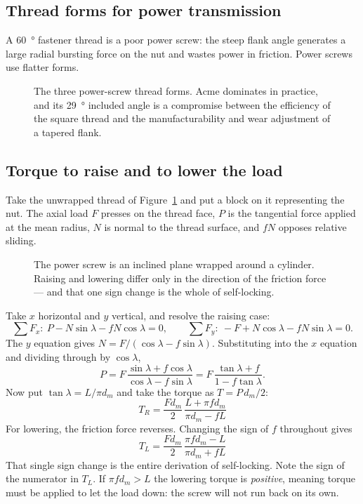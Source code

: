\documentclass[11pt,a4paper]{article}
\begin{document}
\subsection{Thread forms for power transmission}

A \SI{60}{\degree} fastener thread is a poor power screw: the steep flank angle generates a large radial
bursting force on the nut and wastes power in friction. Power screws use flatter forms.

\begin{figure}[H]\centering

\caption{The three power-screw thread forms. Acme dominates in practice, and its \SI{29}{\degree}
included angle is a compromise between the efficiency of the square thread and the manufacturability
and wear adjustment of a tapered flank.}
\end{figure}

\subsection{Torque to raise and to lower the load}

Take the unwrapped thread of Figure~\ref{fig:incline} and put a block on it representing the nut. The axial load $F$
presses on the thread face, $P$ is the tangential force applied at the mean radius, $N$ is normal to
the thread surface, and $fN$ opposes relative sliding.

\begin{figure}[H]\centering

\caption{The power screw is an inclined plane wrapped around a cylinder. Raising and lowering differ
only in the direction of the friction force --- and that one sign change is the whole of self-locking.}
\label{fig:incline}
\end{figure}

Take $x$ horizontal and $y$ vertical, and resolve the raising case:
\[
\sum F_x:\ P - N\sin\lambda - fN\cos\lambda = 0,
\qquad
\sum F_y:\ -F + N\cos\lambda - fN\sin\lambda = 0 .
\]
The $y$ equation gives $N = F/(\cos\lambda - f\sin\lambda)$. Substituting into the $x$ equation and
dividing through by $\cos\lambda$,
\[
P = F\,\frac{\sin\lambda + f\cos\lambda}{\cos\lambda - f\sin\lambda}
  = F\,\frac{\tan\lambda + f}{1 - f\tan\lambda}.
\]
Now put $\tan\lambda = L/\pi d_m$ and take the torque as $T = P\,d_m/2$:
\[
\boxed{\;T_R = \frac{F d_m}{2}\,\frac{L + \pi f d_m}{\pi d_m - f L}\;}
\]
For lowering, the friction force reverses. Changing the sign of $f$ throughout gives
\[
\boxed{\;T_L = \frac{F d_m}{2}\,\frac{\pi f d_m - L}{\pi d_m + f L}\;}
\]
That single sign change is the entire derivation of self-locking.
Note the sign of the numerator in $T_L$. If $\pi f d_m > L$ the lowering torque is \emph{positive},
meaning torque must be applied to let the load down: the screw will not run back on its own.
\end{document}

